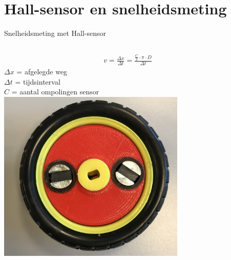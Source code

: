\documentclass[t,12pt,english
\ifx\beamermode\undefined\else,\beamermode\fi
]{beamer}
\begin{document}
\section{Hall-sensor en snelheidsmeting}
\begin{frame}{Snelheidsmeting met Hall-sensor}
\begin{columns}
	\begin{column}{0.5\textwidth}
		\begin{gather*}
		v=\frac{\Delta x}{\Delta t} = \frac{\frac{C}{2}\cdot\pi\cdot D}{\Delta t}
		\end{gather*}
		$\Delta x$ = afgelegde weg\\
		$\Delta t$ = tijdsinterval\\
		$C$ = aantal ompolingen sensor
		\centering
		\includegraphics[width=0.7\textwidth,height=0.7\textheight,keepaspectratio]{wielmagneten.png}
	\end{column}
	\begin{column}{0.5\textwidth}  
		\begin{center}

\end{center}
\end{column}
\end{columns}
\end{frame}
\end{document}
